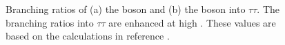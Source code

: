 \begin{figure}[h!]
\begin{center}
\end{center}
\caption[Branching ratios of the \PHiggs and \PHiggsps bosons into $\tau\tau$.]{Branching ratios of (a) the \PHiggs boson and (b) the \PHiggsps boson into $\tau\tau$. The branching
ratios into $\tau\tau$ are enhanced at high \tanb. These values are based on the
calculations in reference \cite{YR3}.}
\label{fig:mhmodp_br}
\end{figure}



